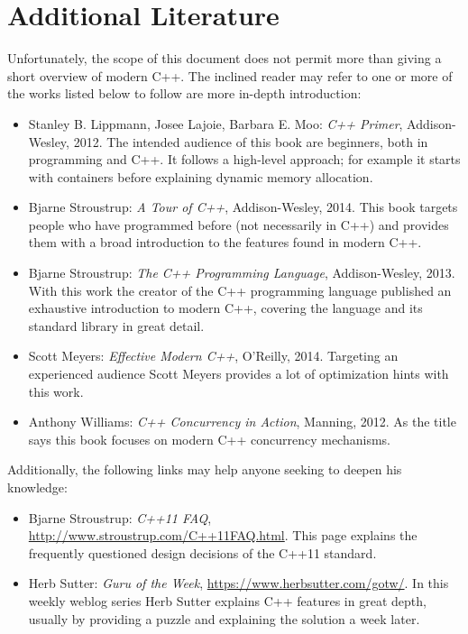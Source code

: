 \section{Additional Literature}

Unfortunately, the scope of this document does not permit more than giving a short overview of modern C++. The inclined reader may refer to one or more of the works listed below to follow are more in-depth introduction:

\begin{itemize}
\item Stanley B. Lippmann, Josee Lajoie, Barbara E. Moo: \textit{C++ Primer}, Addison-Wesley, 2012. The intended audience of this book are beginners, both in programming and C++. It follows a high-level approach; for example it starts with containers before explaining dynamic memory allocation.
\item Bjarne Stroustrup: \textit{A Tour of C++}, Addison-Wesley, 2014. This book targets people who have programmed before (not necessarily in C++) and provides them with a broad introduction to the features found in modern C++.
\item Bjarne Stroustrup: \textit{The C++ Programming Language}, Addison-Wesley, 2013. With this work the creator of the C++ programming language published an exhaustive introduction to modern C++, covering the language and its standard library in great detail.
\item Scott Meyers: \textit{Effective Modern C++}, O'Reilly, 2014. Targeting an experienced audience Scott Meyers provides a lot of optimization hints with this work.
\item Anthony Williams: \textit{C++ Concurrency in Action}, Manning, 2012. As the title says this book focuses on modern C++ concurrency mechanisms.
\end{itemize}

Additionally, the following links may help anyone seeking to deepen his knowledge:

\begin{itemize}
\item Bjarne Stroustrup: \textit{C++11 FAQ}, \url{http://www.stroustrup.com/C++11FAQ.html}. This page explains the frequently questioned design decisions of the C++11 standard.
\item Herb Sutter: \textit{Guru of the Week}, \url{https://www.herbsutter.com/gotw/}. In this weekly weblog series Herb Sutter explains C++ features in great depth, usually by providing a puzzle and explaining the solution a week later.
\end{itemize}